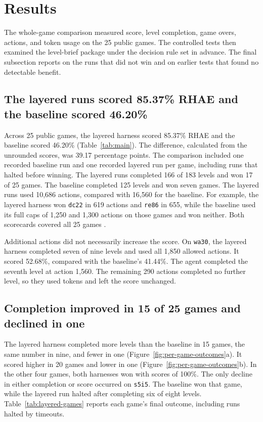 \section{Results}\label{sec:results}
The whole-game comparison measured score, level completion, game overs, actions, and token usage on the 25 public games. The controlled tests then examined the level-brief package under the decision rule set in advance. The final subsection reports on the runs that did not win and on earlier tests that found no detectable benefit.

\subsection{The layered runs scored 85.37\% RHAE and the baseline scored 46.20\%}\label{sec:result-score}
Across 25 public games, the layered harness scored 85.37\% RHAE and the baseline scored 46.20\% (Table~\ref{tab:main}). The difference, calculated from the unrounded scores, was 39.17 percentage points. The comparison included one recorded baseline run and one recorded layered run per game, including runs that halted before winning. The layered runs completed 166 of 183 levels and won 17 of 25 games. The baseline completed 125 levels and won seven games. The layered runs used 10,686 actions, compared with 16,560 for the baseline. For example, the layered harness won \texttt{dc22} in 619 actions and \texttt{re86} in 655, while the baseline used its full caps of 1,250 and 1,300 actions on those games and won neither. Both scorecards covered all 25 games \citep{scorecard2026baselinefinal,scorecard2026finalreplay,dai2026baselinefinalcard,dai2026finalmanifest}.



Additional actions did not necessarily increase the score. On \texttt{wa30}, the layered harness completed seven of nine levels and used all 1,850 allowed actions. It scored 52.68\%, compared with the baseline's 41.44\%. The agent completed the seventh level at action 1,560. The remaining 290 actions completed no further level, so they used tokens and left the score unchanged.

\subsection{Completion improved in 15 of 25 games and declined in one}\label{sec:result-completion}
The layered harness completed more levels than the baseline in 15 games, the same number in nine, and fewer in one (Figure~\ref{fig:per-game-outcomes}a). It scored higher in 20 games and lower in one (Figure~\ref{fig:per-game-outcomes}b). In the other four games, both harnesses won with scores of 100\%. The only decline in either completion or score occurred on \texttt{s5i5}. The baseline won that game, while the layered run halted after completing six of eight levels. Table~\ref{tab:layered-games} reports each game's final outcome, including runs halted by timeouts.


